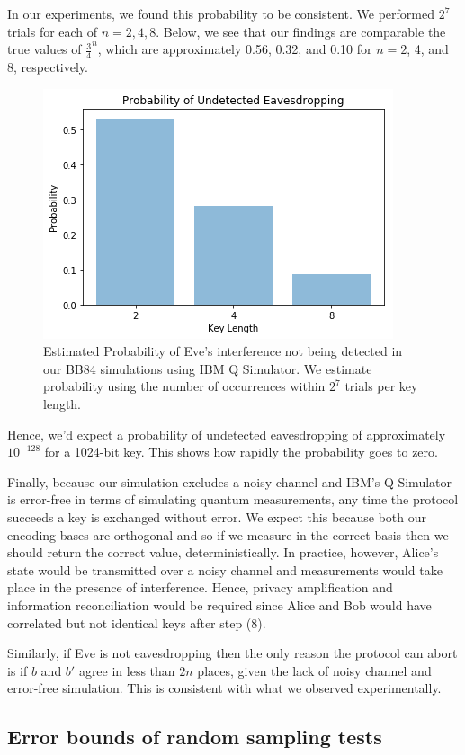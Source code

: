 \documentclass[12]{amsart}
\begin{document}
In our experiments, we found this probability to be consistent. We performed $2^7$ trials for each of $n=2, 4, 8$. Below, we see that our findings are comparable the true values of $\frac{3}{4}^n$, which are approximately 0.56, 0.32, and 0.10 for $n=2$, 4, and 8, respectively.

\begin{figure}[H]
\centering
\includegraphics[width=0.5\linewidth]{results.png}	
\caption{Estimated Probability of Eve's interference not being detected in our BB84 simulations using IBM Q Simulator. We estimate probability using the number of occurrences within $2^7$ trials per key length.}
\end{figure}

Hence, we'd expect a probability of undetected eavesdropping of approximately $10^{-128}$ for a 1024-bit key. This shows how rapidly the probability goes to zero. 

Finally, because our simulation excludes a noisy channel and IBM's Q Simulator is error-free in terms of simulating quantum measurements, any time the protocol succeeds a key is exchanged without error. We expect this because both our encoding bases are orthogonal and so if we measure in the correct basis then we should return the correct value, deterministically. In practice, however, Alice's state would be transmitted over a noisy channel and measurements would take place in the presence of interference. Hence, privacy amplification and information reconciliation would be required since Alice and Bob would have correlated but not identical keys after step (8). 

Similarly, if Eve is not eavesdropping then the only reason the protocol can abort is if $b$ and $b'$ agree in less than $2n$ places, given the lack of noisy channel and error-free simulation. This is consistent with what we observed experimentally. 

\subsection{Error bounds of random sampling tests}\label{error_bounds}
\end{document}
